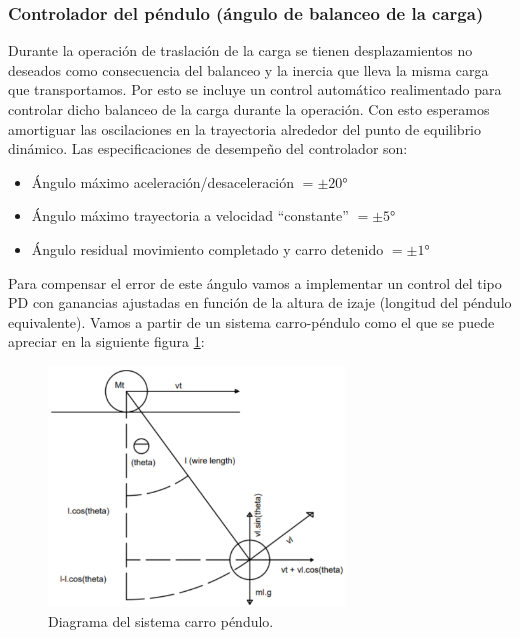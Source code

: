 \documentclass[11pt]{article}
\begin{document}
\subsubsection{Controlador del péndulo (ángulo de balanceo de la carga)}

Durante la operación de traslación de la carga se tienen desplazamientos no deseados como consecuencia del balanceo y la inercia que lleva la misma carga que transportamos. Por esto se incluye un control automático realimentado para controlar dicho balanceo de la carga durante la operación. Con esto esperamos amortiguar las oscilaciones en la trayectoria alrededor del punto de equilibrio dinámico. Las especificaciones de desempeño del controlador son:

\begin{itemize}
	\item Ángulo máximo aceleración/desaceleración $=\pm 20°$
	\item Ángulo máximo trayectoria a velocidad ``constante'' $=\pm 5°$
	\item Ángulo residual movimiento completado y carro detenido $=\pm 1°$
\end{itemize}

Para compensar el error de este ángulo vamos a implementar un control del tipo PD con ganancias ajustadas en función de la altura de izaje (longitud del péndulo equivalente). Vamos a partir de un sistema carro-péndulo como el que se puede apreciar en la siguiente figura \ref{fig:sistema_carro_pendulo}:

\begin{figure}[h!]
	\centering
	\includegraphics[width=0.7\textwidth]{images/imagen_14_sistema_carro_pendulo.png}
	\caption{Diagrama del sistema carro péndulo.}
	\label{fig:sistema_carro_pendulo}
\end{figure}
\end{document}
